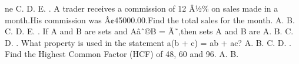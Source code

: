 \documentclass{article}
\begin{document}
\begin{multicols}{2}
ne \indent C. \newline \indent D. \newline \indent E.  \newline{}. A trader receives a commission of 12 Â½\% on sales made in a month.His commission was Â¢45000.00.Find the total sales for the month. \newline \indent A. \newline \indent B. \newline \indent C. \newline \indent D. \newline \indent E.  \newline{}.  If A and B are sets and Aâˆ©B = Ã˜,then sets A and B are \newline \indent A. \newline \indent B. \newline \indent C. \newline \indent D.  \newline{}. What property is used in the statement a(b + c) = ab + ac? \newline \indent A. \newline \indent B. \newline \indent C. \newline \indent D.  \newline{}. Find the Highest Common Factor (HCF) of 48, 60 and 96. \newline \indent A. \newline \indent B. \ne
\end{multicols}
\end{document}
